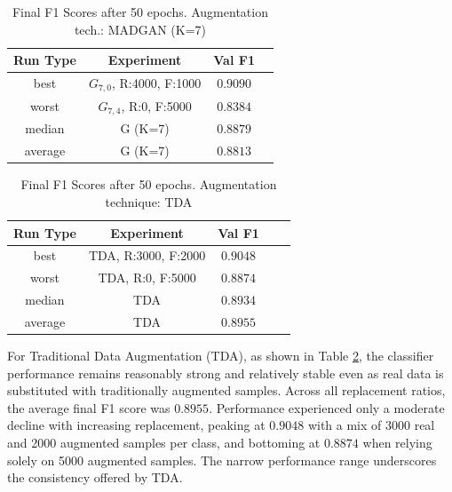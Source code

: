 \begin{table}[H]
	\vspace{-1.5em}
	\centering
	\begin{tabular}{|c|c|c|c|}
		\hline
		Run Type & Experiment & Val F1 \\ \hline
		best & \(G_{7, 0}\), R:4000, F:1000 & $0.9090$\\ \hline
		worst & \(G_{7, 4}\), R:0, F:5000 & $0.8384$\\ \hline
		median & G (K=7) & $0.8879$\\ \hline
		average & G (K=7) & $0.8813$
		\\ \hline
	\end{tabular}
    \caption{Final F1 Scores after 50 epochs. Augmentation tech.: MADGAN (K=7)}
        \label{tab:res_replacement_fashion_tda_vs_madgan__madgan}
\end{table}
\begin{table}[H]
	\centering
	\vspace{-1.5em}
	\begin{tabular}{|c|c|c|c|c|}
		\hline
		Run Type & Experiment & Val F1 \\ \hline
		best & TDA, R:3000, F:2000 & $0.9048$\\ \hline
		worst & TDA, R:0, F:5000 & $0.8874$\\ \hline
		median & TDA & $0.8934$\\ \hline
		average & TDA & $0.8955$
		\\ \hline
	\end{tabular}
    \caption{Final F1 Scores after 50 epochs. Augmentation technique: TDA}
        \label{tab:res_replacement_fashion_tda_vs_madgan__tda}
\end{table}

For Traditional Data Augmentation (TDA), as shown in Table \ref{tab:res_replacement_fashion_tda_vs_madgan__tda}, the classifier performance remains reasonably strong and relatively stable even as real data is substituted with traditionally augmented samples. Across all replacement ratios, the average final F1 score was $0.8955$. Performance experienced only a moderate decline with increasing replacement, peaking at $0.9048$ with a mix of 3000 real and 2000 augmented samples per class, and bottoming at $0.8874$ when relying solely on 5000 augmented samples. The narrow performance range underscores the consistency offered by TDA.

